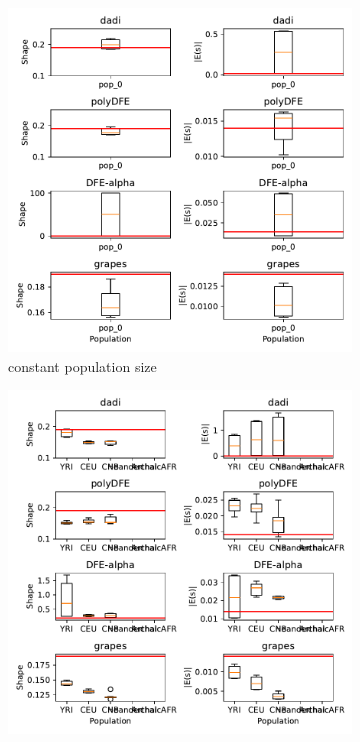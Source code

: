 \documentclass[hidelinks]{article}
\begin{document}
    \begin{figure}[htbp]
        \centering
        \begin{subfigure}{.5\textwidth}
          \centering
          \includegraphics[width=\linewidth]{figures/HomSap/Constant/dfe.inference.benchmark.pdf}
          \caption{constant population size}
          \label{fig:homsap-dfe.constant}
        \end{subfigure}%
        \begin{subfigure}{.5\textwidth}
          \centering
          \includegraphics[width=\linewidth]{figures/HomSap/OOA/dfe.inference.benchmark.pdf}

\end{subfigure}
\end{figure}
\end{document}
